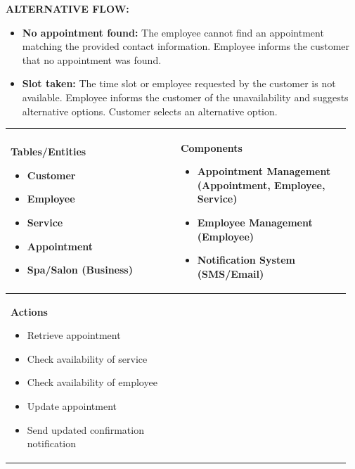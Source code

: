 \documentclass[]{VUMIFTemplateClass}
\newenvironment{mpitemlist}[1][\linewidth]{%
    \begin{minipage}[t]{#1}%
        \setlength{\leftmargini}{12pt}%
        \begin{itemize}%
            \setlength{\itemsep}{1pt}%
            \setlength{\parskip}{0pt}%
            \setlength{\parsep}{0pt}%
}{%
        \end{itemize}%
    \end{minipage}\newline
}
\begin{document}
\textbf{ALTERNATIVE FLOW:}


\begin{itemize}
\item \textbf{No appointment found: } The employee cannot find an appointment matching the provided contact information.
Employee informs the customer that no appointment was found. 
\item \textbf{Slot taken: } The time slot or employee requested by the customer is not available.
Employee informs the customer of the unavailability and suggests alternative options.
Customer selects an alternative option.
\end{itemize}




\begin{center}
\setlength{\tabcolsep}{8pt}
\begin{tabular}{|p{0.48\linewidth}|p{0.48\linewidth}|}
\hline
\textbf{Tables/Entities} \newline
\begin{mpitemlist}
\item Customer
\item Employee
\item Service
\item Appointment
\item Spa/Salon (Business)
\end{mpitemlist}
&
\textbf{Components} \newline
\begin{mpitemlist}
\item Appointment Management (Appointment, Employee, Service)
\item Employee Management (Employee)
\item Notification System (SMS/Email)
\end{mpitemlist}
\\ \hline
\textbf{Actions} \newline
\begin{mpitemlist}
\item Retrieve appointment
\item Check availability of service
\item Check availability of employee
\item Update appointment
\item Send updated confirmation notification
\end{mpitemlist}
&

\\ \hline
\end{tabular}
\end{center}
\end{document}
